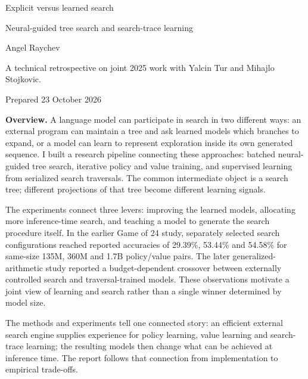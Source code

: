 \documentclass[11pt,letterpaper]{article}
\begin{document}
\thispagestyle{plain}
\begin{center}
{\PublicationTitleFont Explicit versus learned search\par}
\vspace{5pt}
{\large Neural-guided tree search and search-trace learning\par}
\vspace{10pt}
{\normalsize Angel Raychev\par}
\smallskip
{\small A technical retrospective on joint 2025 work with Yalcin Tur and Mihajlo Stojkovic.\par}
{\small\color{publicationmuted}Prepared 23 October 2026\par}
\vspace{6pt}
\end{center}
\vspace{2pt}
\textbf{Overview.} A language model can participate in search in two different ways: an external program can maintain a tree and ask learned models which branches to expand, or a model can learn to represent exploration inside its own generated sequence. I built a research pipeline connecting these approaches: batched neural-guided tree search, iterative policy and value training, and supervised learning from serialized search traversals. The common intermediate object is a search tree; different projections of that tree become different learning signals.

The experiments connect three levers: improving the learned models, allocating more inference-time search, and teaching a model to generate the search procedure itself. In the earlier Game of 24 study, separately selected search configurations reached reported accuracies of 29.39\%, 53.44\% and 54.58\% for same-size 135M, 360M and 1.7B policy/value pairs. The later generalized-arithmetic study reported a budget-dependent crossover between externally controlled search and traversal-trained models. These observations motivate a joint view of learning and search rather than a single winner determined by model size.

The methods and experiments tell one connected story: an efficient external search engine supplies experience for policy learning, value learning and search-trace learning; the resulting models then change what can be achieved at inference time. The report follows that connection from implementation to empirical trade-offs.
\end{document}
